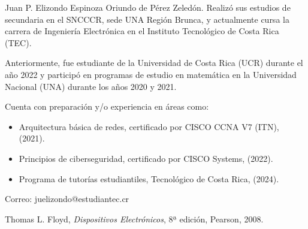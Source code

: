 \documentclass[journal]{IEEEtran}
\begin{document}
\begin{IEEEbiographynophoto}{Juan P. Elizondo Espinoza}
        Oriundo de Pérez Zeledón. Realizó sus estudios de secundaria en el SNCCCR, sede UNA Región Brunca, y actualmente cursa la carrera de Ingeniería Electrónica en el Instituto Tecnológico de Costa Rica (TEC). 
        
        Anteriormente, fue estudiante de la Universidad de Costa Rica (UCR) durante el año 2022 y participó en programas de estudio en matemática en la Universidad Nacional (UNA) durante los años 2020 y 2021. 
        
        Cuenta con preparación y/o experiencia en áreas como:
        \begin{itemize}
            \item Arquitectura básica de redes, certificado por CISCO CCNA V7 (ITN), (2021).
            \item Principios de ciberseguridad, certificado por CISCO Systems, (2022).
            \item Programa de tutorías estudiantiles, Tecnológico de Costa Rica, (2024).
        \end{itemize}
        
        Correo: juelizondo@estudiantec.cr
\end{IEEEbiographynophoto}


\begin{thebibliography}{11}
    Thomas L. Floyd, \emph{Dispositivos Electrónicos}, 8ª edición, Pearson, 2008.
\end{thebibliography}
\end{document}
